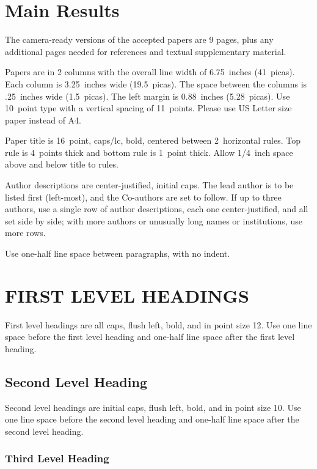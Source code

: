 \documentclass[twoside]{article}
\begin{document}
\section{Main Results}


The camera-ready versions of the accepted papers are 9 pages,
plus any additional pages needed for references and textual supplementary material.

Papers are in 2 columns with the overall line width of 6.75~inches (41~picas).
Each column is 3.25~inches wide (19.5~picas).  The space
between the columns is .25~inches wide (1.5~picas).  The left margin is 0.88~inches (5.28~picas).
Use 10~point type with a vertical spacing of
11~points. Please use US Letter size paper instead of A4.

Paper title is 16~point, caps/lc, bold, centered between 2~horizontal rules.
Top rule is 4~points thick and bottom rule is 1~point thick.
Allow 1/4~inch space above and below title to rules.

Author descriptions are center-justified, initial caps.  The lead
author is to be listed first (left-most), and the Co-authors are set
to follow.  If up to three authors, use a single row of author
descriptions, each one center-justified, and all set side by side;
with more authors or unusually long names or institutions, use more
rows.

Use one-half line space between paragraphs, with no indent.

\section{FIRST LEVEL HEADINGS}

First level headings are all caps, flush left, bold, and in point size
12. Use one line space before the first level heading and one-half line space
after the first level heading.

\subsection{Second Level Heading}

Second level headings are initial caps, flush left, bold, and in point
size 10. Use one line space before the second level heading and one-half line
space after the second level heading.

\subsubsection{Third Level Heading}
\end{document}
